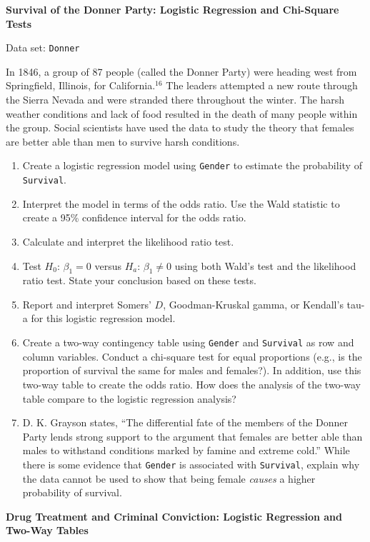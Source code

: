 \documentclass[
]{report}
\begin{document}
\begin{list}{E..}{ \setlength{\itemsep}{1.2em}}
  \item \textbf{Survival of the Donner Party: Logistic Regression and Chi-Square Tests}

Data set: \texttt{Donner}

In 1846, a group of 87 people (called the Donner Party) were heading west from Springfield, Illinois, for California.$^{16}$ The leaders attempted a new route through the Sierra Nevada and were stranded there throughout the winter. The harsh weather conditions and lack of food resulted in the death of many people within the group. Social scientists have used the data to study the theory that females are better able than men to survive harsh conditions.

  \begin{enumerate}
    \item Create a logistic regression model using \texttt{Gender} to estimate the probability of \texttt{Survival}.
    \item Interpret the model in terms of the odds ratio. Use the Wald statistic to create a 95\% confidence interval for the odds ratio.
    \item Calculate and interpret the likelihood ratio test.
    \item Test $H_0$: $\beta_1 = 0$ versus $H_a$: $\beta_1 \ne 0$ using both Wald’s test and the likelihood ratio test. State your conclusion based on these tests.
    \item Report and interpret Somers’ $D$, Goodman-Kruskal gamma, or Kendall’s tau-a for this logistic regression model.
    \item Create a two-way contingency table using \texttt{Gender} and \texttt{Survival} as row and column variables. Conduct a chi-square test for equal proportions (e.g., is the proportion of survival the same for males and females?). In addition, use this two-way table to create the odds ratio. How does the analysis of the two-way table compare to the logistic regression analysis?
    \item D. K. Grayson states, “The differential fate of the members of the Donner Party lends strong support to the argument that females are better able than males to withstand conditions marked by famine and extreme cold.” While there is some evidence that \texttt{Gender} is associated with \texttt{Survival}, explain why the data cannot be used to show that being female \textit{causes} a higher probability of survival.
  \end{enumerate}

  \item \textbf{Drug Treatment and Criminal Conviction: Logistic Regression and Two-Way Tables}


\end{list}
\end{document}
